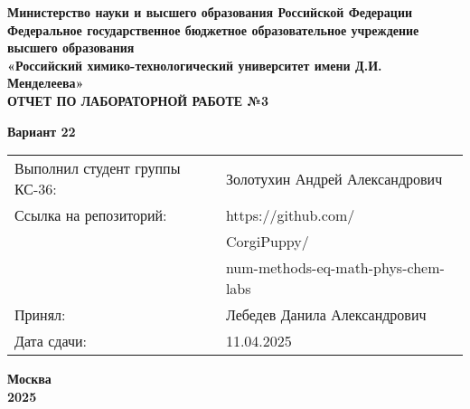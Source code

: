 \documentclass[12pt, a4paper]{report}
\begin{document}
	\begin{titlepage}
		\begin{center}
			\large \textbf{Министерство науки и высшего образования Российской Федерации} \\
			\large \textbf{Федеральное государственное бюджетное образовательное учреждение высшего образования} \\
			\large \textbf{«Российский химико-технологический университет имени Д.И. Менделеева»} \\

			\vspace*{4cm}
			\LARGE \textbf{ОТЧЕТ ПО ЛАБОРАТОРНОЙ РАБОТЕ №3}

			\vspace*{1cm}
			\LARGE \textbf{Вариант 22}

			\vspace*{4cm}
			\begin{flushright}
				\Large
				\begin{tabular}{>{\raggedleft\arraybackslash}p{9cm} p{10cm}}
					Выполнил студент группы КС-36: & Золотухин Андрей Александрович \\
					Ссылка на репозиторий: & https://github.com/ \\
					& CorgiPuppy/ \\
					& num-methods-eq-math-phys-chem-labs \\
					Принял: & Лебедев Данила Александрович \\
					Дата сдачи: & 11.04.2025 \\
				\end{tabular}
			\end{flushright}

			\vspace*{4cm}
			\Large \textbf{Москва \\ 2025}
		\end{center}
	\end{titlepage}

	\tableofcontents
	\thispagestyle{empty}
	\newpage

\end{document}
